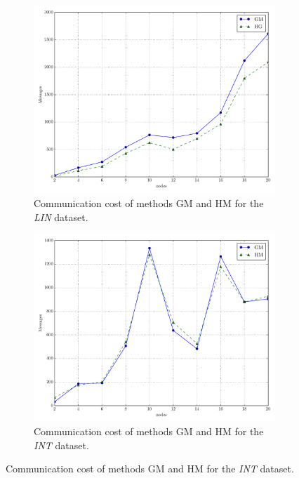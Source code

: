 \begin{figure}[!h]
\begin{subfigure}{0.32\textwidth}
  \includegraphics[width=\linewidth]{img/bal_msg_linear_nodes.pdf}
  \caption{Communication cost of methods GM and HM for the \emph{LIN} dataset.}
\end{subfigure}\hfill
\begin{subfigure}{0.32\textwidth}
  \includegraphics[width=\linewidth]{img/bal_msg_interweaving_nodes.pdf}
  \caption{Communication cost of methods GM and HM for the \emph{INT} dataset.}
\end{subfigure}\hfill

\end{figure}
